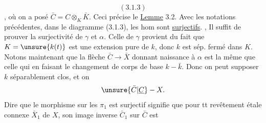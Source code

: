 \[(3.1.3)\]
,
où on a posé $\bar C=C\otimes_K\bar K$.  Ceci précise le
\uline{Lemme} 3.2. Avec les  notations précédentes, dans le diagramme (3.1.3), les  hom    sont \uline{surjectifs}.
, Il suffit de prouver la surjectivité de $\gamma$ et $\alpha$. Celle de $\gamma$ provient du fait que $K=\unsure{k(t)}$ est une extension  pure de $k$, donc   $k$ est sép. fermé dans $K$.
Notons maintenant que la flèche $\bar C\longrightarrow\bar X$ donnant naissance à $\alpha$ est la même que celle qui  en  faisant le changement de corps de base $k-\bar k$. Donc on peut supposer $k$ séparablement clos, et  on  
\[\unsure{\bar C|\underline C}-X.\]
Dire que le morphisme sur les $\pi_1$ est surjectif signifie que pour tt revêtement étale connexe $\bar X_1$ de $X$, son image inverse $\bar C_1$ sur $\bar C$ est
